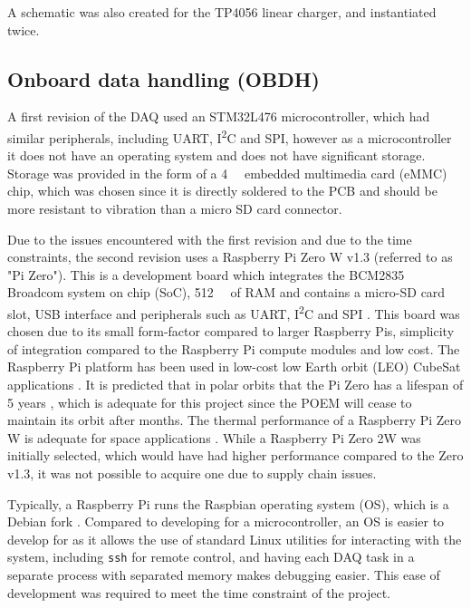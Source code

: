 \documentclass{report}
\newcommand{\iic}{{I\textsuperscript{2}C}}
\begin{document}
A schematic was also created for the TP4056 linear charger, and instantiated twice.

\subsection{Onboard data handling (OBDH)}

A first revision of the DAQ used an STM32L476 microcontroller, which had similar peripherals, including UART, {\iic} and SPI, however as a microcontroller it does not have an operating system and does not have significant storage. Storage was provided in the form of a \SI{4}{\giga\byte} embedded multimedia card (eMMC) chip, which was chosen since it is directly soldered to the PCB and should be more resistant to vibration than a micro SD card connector.

Due to the issues encountered with the first revision and due to the time constraints, the second revision uses a Raspberry Pi Zero W v1.3 (referred to as "Pi Zero"). This is a development board which integrates the BCM2835 Broadcom system on chip (SoC), \SI{512}{\mega\byte} of RAM and contains a micro-SD card slot, USB interface and peripherals such as UART, {\iic} and SPI \cite{upton2016raspberry}. This board was chosen due to its small form-factor compared to larger Raspberry Pis, simplicity of integration compared to the Raspberry Pi compute modules and low cost. The Raspberry Pi platform has been used in low-cost low Earth orbit (LEO) CubeSat applications \cite{guertin2022raspberry}. It is predicted that in polar orbits that the Pi Zero has a lifespan of 5 years \cite{guertin2022raspberry}, which is adequate for this project since the POEM will cease to maintain its orbit after  months. The thermal performance of a Raspberry Pi Zero W is adequate for space applications \cite{guertin2022raspberry}. While a Raspberry Pi Zero 2W was initially selected, which would have had higher performance compared to the Zero v1.3, it was not possible to acquire one due to supply chain issues.

Typically, a Raspberry Pi runs the Raspbian operating system (OS), which is a Debian fork \cite{upton2016raspberry}. Compared to developing for a microcontroller, an OS is easier to develop for as it allows the use of standard Linux utilities for interacting with the system, including \texttt{ssh} for remote control, and having each DAQ task in a separate process with separated memory makes debugging easier. This ease of development was required to meet the time constraint of the project. %
\end{document}
